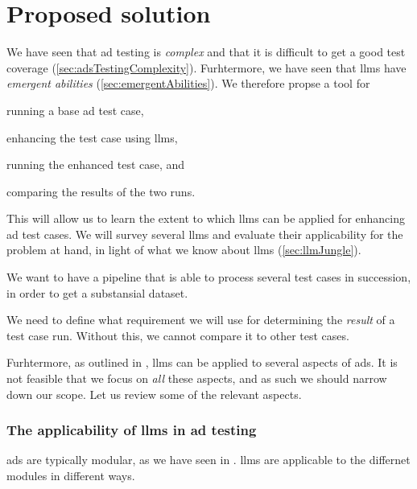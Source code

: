 \section{Proposed solution}\label{sec:solutionProposal}

We have seen that \acrshort{ad} testing is \textit{complex} and that it is difficult to get a good
test coverage (\cref{sec:adsTestingComplexity}). Furhtermore, we have seen that \acrshort{llms} have
\textit{emergent abilities} (\cref{sec:emergentAbilities}). We therefore propse a tool for
\begin{inparaenum}
    \item running a base \acrshort{ad} test case,
    \item enhancing the test case using \acrshort{llms},
    \item running the enhanced test case,
    and
    \item comparing the results of the two runs.
\end{inparaenum}

This will allow us to learn the extent to which \acrshort{llms} can be applied for enhancing
\acrlong{ad} test cases. We will survey several \acrshort{llms} and evaluate their applicability for
the problem at hand, in light of what we know about \acrshort{llms} (\cref{sec:llmJungle}).

We want to have a pipeline that is able to process several test cases in succession, in order to get
a substansial dataset.

We need to define what requirement we will use for determining the \textit{result} of a test case
run. Without this, we cannot compare it to other test cases.

Furhtermore, as outlined in \citeauthor{LLM4AD}, \acrlong{llms} can be applied to several aspects
of \acrlong{ads}. It is not feasible that we focus on \textit{all} these aspects, and as such we
should narrow down our scope. Let us review some of the relevant aspects.

\subsubsection{The applicability of \acrshort{llms} in \acrshort{ad} testing}

\acrlong{ads} are typically modular, as we have seen in .
\acrshort{llms} are applicable to the differnet modules in different ways.



